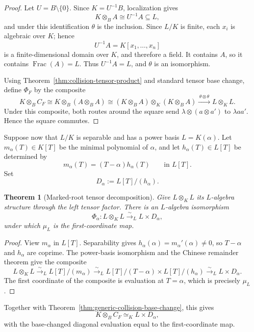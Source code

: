 \documentclass[11pt]{article}
\newtheorem{theorem}{Theorem}[section]
\theoremstyle{remark}
\DeclareMathOperator{\Frac}{Frac}
\begin{document}
\begin{proof}
Let \(U=B\setminus\{0\}\).  Since \(K=U^{-1}B\), localization gives
\[
  K\otimes_BA\cong U^{-1}A\subseteq L,
\]
and under this identification \(\theta\) is the inclusion.  Since \(L/K\)
is finite, each \(x_i\) is algebraic over \(K\); hence
\[
  U^{-1}A=K[x_1,\dots,x_n]
\]
is a finite-dimensional domain over \(K\), and therefore a field.  It
contains \(A\), so it contains \(\Frac(A)=L\).  Thus \(U^{-1}A=L\), and
\(\theta\) is an isomorphism.

Using Theorem~\ref{thm:collision-tensor-product} and standard tensor base
change, define \(\Phi_F\) by the composite
\[
  K\otimes_BC_F
  \cong
  K\otimes_B(A\otimes_BA)
  \cong
  (K\otimes_BA)\otimes_K(K\otimes_BA)
  \xrightarrow{\ \theta\otimes\theta\ }
  L\otimes_KL.
\]
Under this composite, both routes around the square send
\(\lambda\otimes(a\otimes a')\) to \(\lambda aa'\).  Hence the square
commutes.
\end{proof}

Suppose now that \(L/K\) is separable and has a power basis
\(L=K(\alpha)\).  Let \(m_\alpha(T)\in K[T]\) be the minimal polynomial
of \(\alpha\), and let \(h_\alpha(T)\in L[T]\) be determined by
\[
  m_\alpha(T)=(T-\alpha)h_\alpha(T)
  \qquad\text{in }L[T].
\]
Set
\[
  D_\alpha:=L[T]/(h_\alpha).
\]

\begin{theorem}[Marked-root tensor decomposition]
\label{thm:marked-root-tensor-decomposition}
Give \(L\otimes_KL\) its \(L\)-algebra structure through the left tensor
factor.  There is an \(L\)-algebra isomorphism
\[
  \Phi_\alpha\colon L\otimes_KL
  \xrightarrow{\sim}_L
  L\times D_\alpha,
\]
under which \(\mu_L\) is the first-coordinate map.
\end{theorem}

\begin{proof}
View \(m_\alpha\) in \(L[T]\).  Separability gives
\(h_\alpha(\alpha)=m_\alpha'(\alpha)\neq0\), so \(T-\alpha\) and
\(h_\alpha\) are coprime.  The power-basis isomorphism and the Chinese
remainder theorem give the composite
\[
  L\otimes_KL
  \xrightarrow{\sim}_L L[T]/(m_\alpha)
  \xrightarrow{\sim}_L
  L[T]/(T-\alpha)\times L[T]/(h_\alpha)
  \xrightarrow{\sim}_L L\times D_\alpha.
\]
The first coordinate of the composite is evaluation at \(T=\alpha\),
which is precisely \(\mu_L\).
\end{proof}

Together with Theorem~\ref{thm:generic-collision-base-change}, this gives
\[
  K\otimes_BC_F
  \simeq_K
  L\times D_\alpha,
\]
with the base-changed diagonal evaluation equal to the first-coordinate
map.
\end{document}
